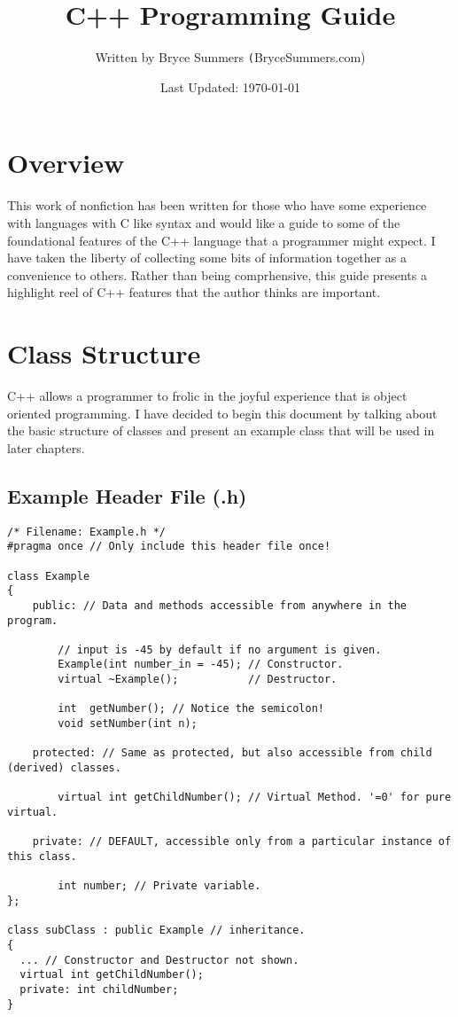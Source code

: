 \documentclass[12pt, letterpaper]{article}
\begin{document}
\title{\color{blue}C++ Programming Guide}
\author{Written by Bryce Summers \texttt(BryceSummers.com)}
\date{\color{red}Last Updated: \today}
\maketitle

\tableofcontents 

\newpage

\section{Overview}

This work of nonfiction has been written for those who have some experience with languages with C like syntax and would like a guide to some of the foundational features of the C++ language that a programmer might expect. I have taken the liberty of collecting some bits of information together as a convenience to others. Rather than being comprhensive, this guide presents a highlight reel of C++ features that the author thinks are important.

\section{Class Structure}

C++ allows a programmer to frolic in the joyful experience that is object oriented programming. I have decided to begin this document by talking about the basic structure of classes and present an example class that will be used in later chapters.

\subsection{Example Header File (.h)} \label{Example1}

\begin{verbatim}
/* Filename: Example.h */
#pragma once // Only include this header file once!

class Example
{
    public: // Data and methods accessible from anywhere in the program.

        // input is -45 by default if no argument is given.
       	Example(int number_in = -45); // Constructor.
        virtual ~Example();           // Destructor.

        int  getNumber(); // Notice the semicolon!
        void setNumber(int n);

    protected: // Same as protected, but also accessible from child (derived) classes.

        virtual int getChildNumber(); // Virtual Method. '=0' for pure virtual.

    private: // DEFAULT, accessible only from a particular instance of this class.

        int number; // Private variable.
};

class subClass : public Example // inheritance.
{
  ... // Constructor and Destructor not shown.
  virtual int getChildNumber();
  private: int childNumber;
}
\end{verbatim}
\end{document}
